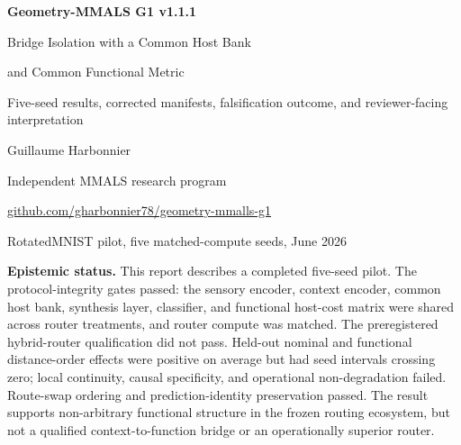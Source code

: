 \documentclass[11pt,a4paper]{article}
\begin{document}
\begin{titlepage}
\centering
\vspace*{0.45cm}
{\Huge\bfseries\color{deepblue} Geometry-MMALS G1 v1.1.1\par}
\vspace{0.25cm}
{\LARGE Bridge Isolation with a Common Host Bank\par}
\vspace{0.08cm}
{\LARGE and Common Functional Metric\par}
\vspace{0.4cm}
{\Large Five-seed results, corrected manifests, falsification outcome, and reviewer-facing interpretation\par}
\vspace{0.7cm}
{\Large Guillaume Harbonnier\par}
\vspace{0.15cm}
{\normalsize Independent MMALS research program\par}
\vspace{0.15cm}
{\normalsize \href{https://github.com/gharbonnier78/geometry-mmalls-g1}{github.com/gharbonnier78/geometry-mmalls-g1}\par}
\vspace{0.55cm}
{\normalsize RotatedMNIST pilot, five matched-compute seeds, June 2026\par}
\vfill
\begin{minipage}{0.94\textwidth}\small
\textbf{Epistemic status.} This report describes a completed five-seed pilot. The protocol-integrity gates passed: the sensory encoder, context encoder, common host bank, synthesis layer, classifier, and functional host-cost matrix were shared across router treatments, and router compute was matched. The preregistered hybrid-router qualification did not pass. Held-out nominal and functional distance-order effects were positive on average but had seed intervals crossing zero; local continuity, causal specificity, and operational non-degradation failed. Route-swap ordering and prediction-identity preservation passed. The result supports non-arbitrary functional structure in the frozen routing ecosystem, but not a qualified context-to-function bridge or an operationally superior router.
\end{minipage}
\vfill
\end{titlepage}
\end{document}
